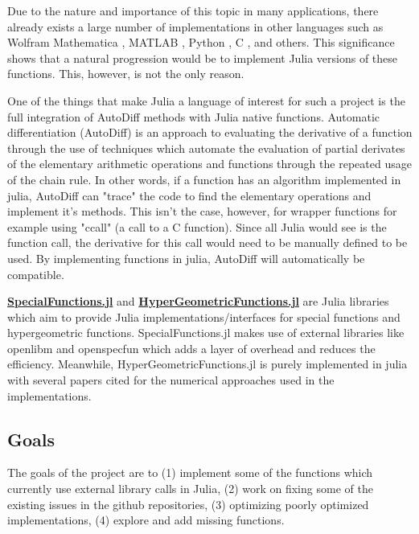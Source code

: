 \documentclass{article}
\theoremstyle{mytheoremstyle}
\theoremstyle{mytheoremstyle}
\theoremstyle{myproblemstyle}
\begin{document}
   Due to the nature and importance of this topic in many applications, there already exists a large number of implementations in other languages such as Wolfram Mathematica \cite{wolfram special functions, wolfram hypergeometric}, MATLAB \cite{matlab special functions, matlab hypergeometric}, Python \cite{scipy, mpmath}, C \cite{mpfr, gsl, gnu clib, cephes, ARM, amos, toms}, and others.
   This significance shows that a natural progression would be to implement Julia versions of these functions. 
   This, however, is not the only reason.

   One of the things that make Julia a language of interest for such a project is the full integration of AutoDiff methods with Julia native functions.
   Automatic differentiation (AutoDiff) is an approach to evaluating the derivative of a function through the use of techniques which automate the evaluation of partial derivates of the elementary arithmetic operations and functions through the repeated usage of the chain rule.\cite{autodiff, ForwardDiff.jl}
   In other words, if a function has an algorithm implemented in julia, AutoDiff can "trace" the code to find the elementary operations and implement it's methods. 
   This isn't the case, however, for wrapper functions for example using "ccall" (a call to a C function). 
   Since all Julia would see is the function call, the derivative for this call would need to be manually defined to be used.
   By implementing functions in julia, AutoDiff will automatically be compatible.

   \href{https://github.com/JuliaMath/SpecialFunctions.jl}{\textbf{SpecialFunctions.jl}} and \href{https://github.com/JuliaMath/HypergeometricFunctions.jl/issues}{\textbf{HyperGeometricFunctions.jl}} are Julia libraries which aim to provide Julia implementations/interfaces for special functions and hypergeometric functions.
   SpecialFunctions.jl makes use of external libraries like openlibm and openspecfun which adds a layer of overhead and reduces the efficiency.
   Meanwhile, HyperGeometricFunctions.jl is purely implemented in julia with several papers cited for the numerical approaches used in the implementations.



    
    \subsection*{Goals}\label{sub:Goals} %
      The goals of the project are to (1) implement some of the functions which currently use external library calls in Julia, (2) work on fixing some of the existing issues in the github repositories, (3) optimizing poorly optimized implementations, (4) explore and add missing functions. 
\end{document}
